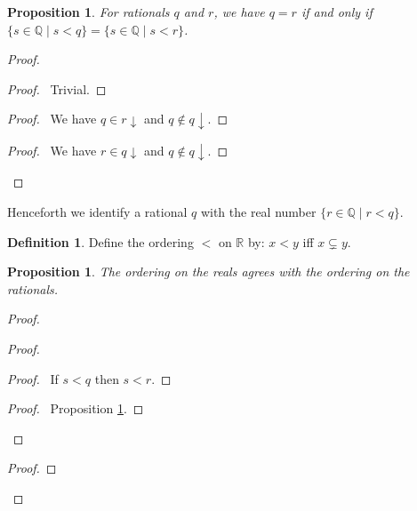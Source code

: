 \documentclass{book}
\let\qed\relax
\newtheorem{prop}[ax]{Proposition}
\theoremstyle{definition}
\newtheorem{df}[ax]{Definition}
\begin{document}
\begin{prop}
\label{prop:QtoRwd}
For rationals $q$ and $r$, we have $q = r$ if and only if $\{ s \in \mathbb{Q} \mid s < q \} = \{ s \in \mathbb{Q} \mid s < r \}$.
\end{prop}

\begin{proof}
\pf
{}
\begin{proof}
	\pf\ Trivial.
\end{proof}
\begin{proof}
	\pf\ We have $q \in r \downarrow$ and $q \notin q \downarrow$.
\end{proof}
\begin{proof}
	\pf\ We have $r \in q \downarrow$ and $q \notin q \downarrow$.
\end{proof}
\qed
\end{proof}

Henceforth we identify a rational $q$ with the real number $\{ r \in \mathbb{Q} \mid r < q \}$.

\begin{df}
Define the ordering $<$ on $\mathbb{R}$ by: $x < y$ iff $x \subsetneq y$.
\end{df}

\begin{prop}
The ordering on the reals agrees with the ordering on the rationals.
\end{prop}

\begin{proof}
\pf
{}
\begin{proof}
	\begin{proof}
		\pf\ If $s < q$ then $s < r$.
	\end{proof}
	\begin{proof}
		\pf\ Proposition \ref{prop:QtoRwd}.
	\end{proof}
\end{proof}
\begin{proof}
\end{proof}
\qed
\end{proof}
\end{document}
